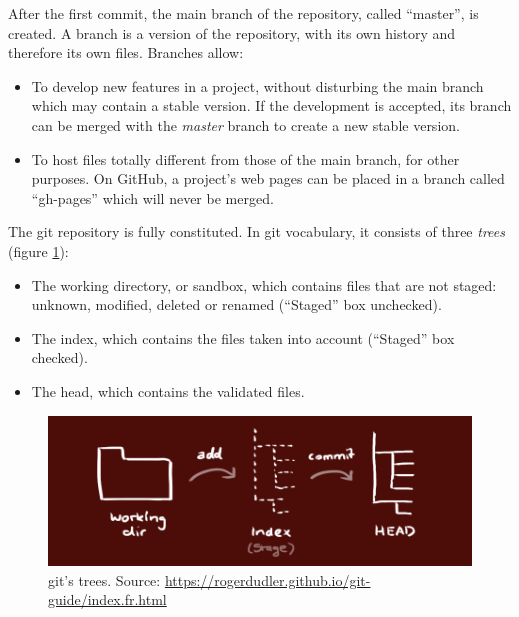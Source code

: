 \documentclass[
  12pt,
  american,
  a4paper,
  extrafontsizes,onecolumn,openright
  ]{memoir}
\providecommand{\tightlist}{%
  \setlength{\itemsep}{0pt}\setlength{\parskip}{0pt}}
\begin{document}
After the first commit, the main branch of the repository, called \enquote{master}, is created.
A branch is a version of the repository, with its own history and therefore its own files.
Branches allow:

\begin{itemize}
\tightlist
\item
  To develop new features in a project, without disturbing the main branch which may contain a stable version.
  If the development is accepted, its branch can be merged with the \emph{master} branch to create a new stable version.
\item
  To host files totally different from those of the main branch, for other purposes.
  On GitHub, a project's web pages can be placed in a branch called \enquote{gh-pages} which will never be merged.
\end{itemize}

The git repository is fully constituted.
In git vocabulary, it consists of three \emph{trees} (figure \ref{fig:git-Trees}):

\begin{itemize}
\tightlist
\item
  The working directory, or sandbox, which contains files that are not staged: unknown, modified, deleted or renamed (\enquote{Staged} box unchecked).
\item
  The index, which contains the files taken into account (\enquote{Staged} box checked).
\item
  The head, which contains the validated files.
\end{itemize}



\scriptsize

\begin{figure}

{\centering \includegraphics[width=0.8\linewidth]{images/git-Trees} 

}

\caption{git's trees. Source: \url{https://rogerdudler.github.io/git-guide/index.fr.html}}\label{fig:git-Trees}
\end{figure}
\end{document}
